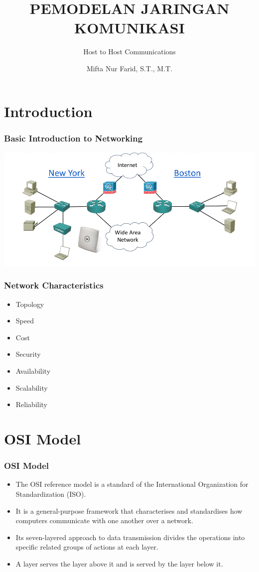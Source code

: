 \documentclass[pdflatex,compress]{beamer}
\title{PEMODELAN JARINGAN KOMUNIKASI}
\subtitle{Host to Host Communications}
\author{Mifta Nur Farid, S.T., M.T.}
\begin{document}
\maketitle

\section{Introduction}

\begin{frame}
	\frametitle{Basic Introduction to Networking}
	\begin{center}
		\includegraphics[width=\linewidth]{img/img01}
	\end{center}
\end{frame}

\begin{frame}
	\frametitle{Network Characteristics}
	\begin{itemize}
		\item Topology
		\item Speed
		\item Cost
		\item Security
		\item Availability
		\item Scalability
		\item Reliability
	\end{itemize}
\end{frame}

\section{OSI Model}

\begin{frame}
	\frametitle{OSI Model}
	\begin{itemize}
		\item The OSI reference model is a standard of the International Organization for Standardization (ISO).
		\item It is a general-purpose framework that characterises and standardises how computers communicate with one another over a network.
		\item Its seven-layered approach to data transmission divides the operations into specific related groups of actions at each layer.
		\item A layer serves the layer above it and is served by the layer below it.
	\end{itemize}
\end{frame}
\end{document}
